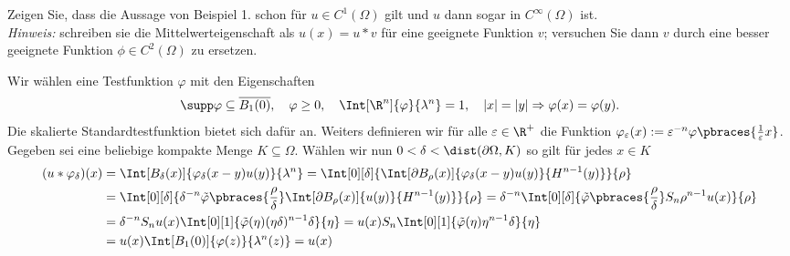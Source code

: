 
\begin{exercise}

Zeigen Sie, dass die Aussage von Beispiel 1. schon für $u \in C^1(\Omega)$ gilt und $u$ dann sogar in $C^\infty(\Omega)$ ist. \\
\textit{Hinweis:}
schreiben sie die Mittelwerteigenschaft als $u(x) = u \ast v$ für eine geeignete Funktion $v$;
versuchen Sie dann $v$ durch eine besser geeignete Funktion $\phi \in C^2(\Omega)$ zu ersetzen.

\end{exercise}


\begin{solution}



	Wir wählen eine Testfunktion $\varphi$ mit den Eigenschaften
	\begin{align*}
	\supp \varphi \subseteq \overline{B_1(0)}, \quad \varphi \geq 0, \quad \Int[\R^n]{\varphi}{\lambda^n} = 1, \quad |x| = |y| \Rightarrow \varphi(x) = \varphi(y).
	\end{align*}
	Die skalierte Standardtestfunktion bietet sich dafür an. Weiters definieren wir für alle $\varepsilon \in \R^+$ die Funktion $\varphi_\varepsilon (x) := \varepsilon^{-n} \varphi\pbraces{\frac{1}{\varepsilon}x}$. Gegeben sei eine beliebige kompakte Menge $K \subseteq \Omega$. Wählen wir nun $0 < \delta < \dist(\partial \Omega, K)$ so gilt für jedes $x \in K$
	\begin{align*}
	(u \ast \varphi_\delta)(x) &= \Int[B_\delta(x)]{\varphi_\delta(x - y) u(y) }{\lambda^n} = \Int[0][\delta]{\Int[\partial B_\rho(x)]{\varphi_\delta(x - y) u(y) }{H^{n-1}(y)}}{\rho} \\
	 &= \Int[0][\delta]{\delta^{-n} \tilde{\varphi}\pbraces{\frac{\rho}{\delta}}\Int[\partial B_\rho(x)]{ u(y) }{H^{n-1}(y)}}{\rho} = \delta^{-n} \Int[0][\delta]{\tilde{\varphi}\pbraces{\frac{\rho}{\delta}}S_n \rho^{n-1} u(x)}{\rho} \\
	 &= \delta^{-n} S_n u(x) \Int[0][1]{\tilde{\varphi}(\eta) (\eta \delta)^{n-1} \delta }{\eta} = u(x) S_n  \Int[0][1]{\tilde{\varphi}(\eta) \eta^{n-1} \delta }{\eta} \\
	 &= u(x) \Int[B_1(0)]{\varphi(z)}{\lambda^n(z)} = u(x)
	\end{align*}
\end{solution}

